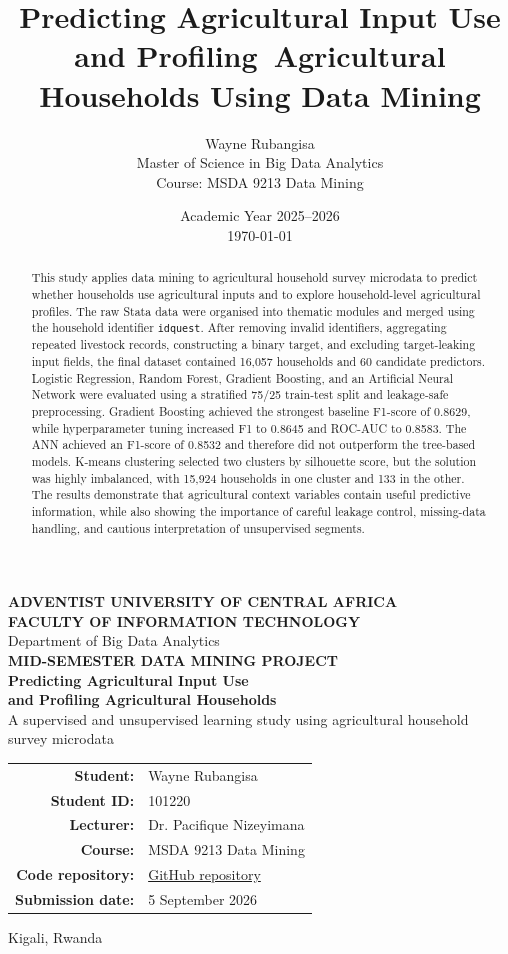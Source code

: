 \documentclass[12pt,a4paper]{article}
\title{\textbf{Predicting Agricultural Input Use and Profiling\ Agricultural Households Using Data Mining}}
\author{Wayne Rubangisa\\[4pt]
Master of Science in Big Data Analytics\\
Course: MSDA 9213 Data Mining}
\date{Academic Year 2025--2026\\\today}
\newcommand{\repositoryurl}{https://github.com/Optimus44/Data-Mining/tree/main/Mid\%20-\%20Exam}
\begin{document}
\begin{titlepage}
    \centering
    \vspace*{1.5cm}
    {\large \textbf{ADVENTIST UNIVERSITY OF CENTRAL AFRICA}}\\[0.3cm]
    {\large \textbf{FACULTY OF INFORMATION TECHNOLOGY}}\\[0.3cm]
    {\large Department of Big Data Analytics}\\[2cm]
    {\Large \textbf{MID-SEMESTER DATA MINING PROJECT}}\\[1.5cm]
    {\huge \bfseries Predicting Agricultural Input Use\\[0.2cm]
    and Profiling Agricultural Households}\\[1.5cm]
    {\Large A supervised and unsupervised learning study using agricultural household survey microdata}\\[2cm]
    \begin{tabular}{>{\bfseries}rl}
        Student: & Wayne Rubangisa \\
        Student ID: & 101220 \\
        Lecturer: & Dr. Pacifique Nizeyimana \\
        Course: & MSDA 9213 Data Mining \\
        Code repository: & \href{\repositoryurl}{GitHub repository} \\
        Submission date: & 5 September 2026
    \end{tabular}
    \vfill
    {\large Kigali, Rwanda}
\end{titlepage}

\tableofcontents
\newpage
{}

\begin{abstract}
This study applies data mining to agricultural household survey microdata to predict whether households use agricultural inputs and to explore household-level agricultural profiles. The raw Stata data were organised into thematic modules and merged using the household identifier \texttt{idquest}. After removing invalid identifiers, aggregating repeated livestock records, constructing a binary target, and excluding target-leaking input fields, the final dataset contained 16,057 households and 60 candidate predictors. Logistic Regression, Random Forest, Gradient Boosting, and an Artificial Neural Network were evaluated using a stratified 75/25 train-test split and leakage-safe preprocessing. Gradient Boosting achieved the strongest baseline F1-score of 0.8629, while hyperparameter tuning increased F1 to 0.8645 and ROC-AUC to 0.8583. The ANN achieved an F1-score of 0.8532 and therefore did not outperform the tree-based models. K-means clustering selected two clusters by silhouette score, but the solution was highly imbalanced, with 15,924 households in one cluster and 133 in the other. The results demonstrate that agricultural context variables contain useful predictive information, while also showing the importance of careful leakage control, missing-data handling, and cautious interpretation of unsupervised segments.
\end{abstract}
\end{document}
